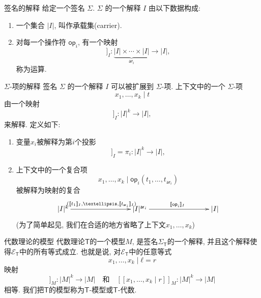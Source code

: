\documentclass{beamer}
\newcommand{\theory}[1]{\mathsf{#1}} %
\newcommand{\signature}[1]{\Sigma_{\theory{#1}}} %
\newcommand{\equations}[1]{\mathcal{E}_{\theory{#1}}} %
\newcommand{\carrier}[1]{|#1|} %
\newcommand{\op}[1]{\mathsf{op}_{#1}} %
\newcommand{\arity}[1]{\mathsf{ar}_{#1}} %
\newcommand{\sem}[1]{[\![#1]\!]} %
\begin{document}
\begin{frame}{签名的解释}
给定一个签名 $\Sigma$. $\Sigma$ 的一个解释 $I$ 由以下数据构成:
\begin{enumerate}
  \item 一个集合 $\carrier{I}$, 叫作承载集(carrier).
  \item 对每一个操作符 $\op{i}$, 有一个映射
    \begin{equation*}
    \sem{\op{i}}_I : \underbrace{\carrier{I} × ⋯ × \carrier{I}}_{\arity{i}} → \carrier{I},
  \end{equation*}
  称为运算.
\end{enumerate}
\end{frame}

\begin{frame}{$\Sigma$-项的解释}
  签名 $\Sigma$ 的一个解释 $I$ 可以被扩展到 $\Sigma$-项. 上下文中的一个 $\Sigma$-项
\begin{equation*}
  x_1, …, x_k ∣ t
\end{equation*}
由一个映射
\begin{equation*}
  \sem{x_1, …, x_k ∣ t}_I : \carrier{I}^k → \carrier{I},
\end{equation*}
来解释. 定义如下:
\begin{enumerate}
  \item 变量$x_i$被解释为第$i$个投影
    \begin{equation*}
    \sem{x_1, …, x_k ∣  x_i}_I = \pi_i : \carrier{I}^k → \carrier{I},
  \end{equation*}
  \item 上下文中的一个复合项
  \begin{equation*}
    x_1, …, x_k ∣ \op{i}(t_1, …, t_{\arity{i}})
  \end{equation*}
  被解释为映射的复合
    \begin{equation*}
    \xymatrix@+6em{
      {\carrier{I}^k} \ar[r]^{(\sem{t_1}_I, …, \sem{t_{\arity{i}}}_I)}
      &
      {\carrier{I}^{\arity{i}}} \ar[r]^{\sem{\op{i}}_I}
      &
      {\carrier{I}}
    }
  \end{equation*}
  (为了简单起见, 我们在合适的地方省略了上下文$x_1, …, x_k$)
\end{enumerate}
\end{frame}

\begin{frame}{代数理论的模型}
  代数理论$\theory{T}$的一个模型$M$, 是签名$\signature{T}$的一个解释, 并且这个解释使得$\equations{T}$中的所有等式成立. 也就是说, 对$\equations{T}$中的任意等式
  \begin{equation*}
  x_1, …, x_k ∣ ℓ = r
\end{equation*}
映射
\begin{equation*}
  \sem{x_1, …, x_k ∣ \ell}_M : \carrier{M}^k → \carrier{M}
  \quad\text{和}\quad
  \sem{x_1, …, x_k ∣ r}_M : \carrier{M}^k → \carrier{M}
\end{equation*}
相等. 我们把$\theory{T}$的模型称为$\theory{T}$-模型或$\theory{T}$-代数.

\end{frame}
\end{document}
